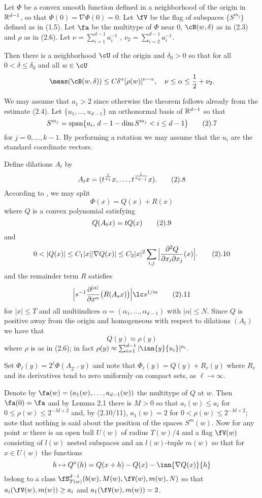  Let $\Phi$ be a convex smooth function 
defined in a neighborhood of the origin
in $\Bbb R^{d-1}$, so that $\Phi(0)=\nabla\Phi(0)=0$. Let
$\fV$ be the flag of subspaces $\{S^{m_j}\}$ defined as in (1.5). 
Let $\fa$ be the multitype of $\Phi$ near $0$, $\cB(w,\delta)$ as in (2.3) and
$\rho$ as in (2.6). Let $\nu=\sum_{i=1}^{d-1} a_i^{-1}$ ,
$\nu_2=\sum_{i=2}^{d-1} a_i^{-1}$. 

Then there is a neighborhood $\cU$ of the origin and 
 $\delta_0> 0$ so that for all $0<\delta\le\delta_0$ and all  $w\in \cU$
$$\meas(\cB(w,\delta))\le C\delta^\alpha [\rho(w)]^{\nu-\alpha},
\quad\nu\le \alpha\le \frac 12 +\nu_2.
$$

\endproclaim

We may assume that $a_1>2$ since otherwise the theorem follows already from the
estimate (2.4).
Let $\{u_1,\dots, u_{d-1}\}$ an orthonormal basis of $\Bbb R^{d-1}$ so that
$$S^{m_j}=\text{span}\{u_i, \, d-1-\dim S^{m_j}<i\le d-1\}\tag 2.7
$$ for $j=0,\dots, k-1$.
By performing a rotation we may assume that the $u_i$ are the standard coordinate vectors. 

Define dilations $A_t$ by
$$A_tx= (t^{\frac{1}{a_1}}x,\dots, t^{\frac{1}{a_{d-1}}}x).\tag 2.8
$$
According to \cite{26}, \cite{16} we may split 
$$\Phi(x) =Q(x)+R(x)$$
where $Q$ is a convex polynomial satisfying 
$$Q(A_t x)=tQ(x) \tag 2.9
$$
and
$$
0<|Q(x)|\le C_1|x||\nabla Q(x)|\le C_2|x|^2 \sum_{i,j}
\Big|\frac{\partial^2 Q}{\partial x_i \partial x_j  }(x)\Big|.
\tag 2.10
$$
and the remainder term $R$ satisfies 
$$
\Big|s^{-1}\frac{\partial^{|\alpha |}}
{ \partial x^\alpha}\big(R(A_s x)\big) \Big| \lc s^{1/m}
\tag 2.11
$$
 for $|x|\le T$ and  all multiindices $\alpha=(\alpha_1,\dots, \alpha_{d-1})$ 
with $|\alpha|\le  N$. 
Since $Q$ is positive away from the origin and homogeneous with respect to dilations $(A_t)$  we have that
$$
Q(y)\approx \rho(y)
$$
where $\rho$ is as  in (2.6); in fact 
$\rho(y)\approx \sum_{i=1}^{d-1}|\inn{y}{u_i}|^{a_i}.$

Set $\Phi_\ell(y)=2^\ell\Phi(A_{2^{-\ell}} y)$ and note that
$\Phi_\ell(y)=Q(y)+R_\ell(y)$ where $R_\ell$ and its derivatives
 tend to zero uniformly on compact sets, as $\ell\to \infty$.


Denote by $\fa(w)=(a_1(w),\dots, a_{d-1}(w))$ the multitype of $Q$ at $w$. 
Then $\fa(0)=\fa$ and
 by Lemma 2.1   there 
is $M>0$ so that $a_i(w)\le a_i$ for $0\le \rho(w)\le 2^{-M+2}$ and, by (2.10/11),  $a_1(w)=2$
for $0< \rho(w)\le 2^{-M+2}$; note that nothing is said about the position of the 
spaces $S^m(w)$.
Now  for any point $w$ there is an open ball $U(w)$ of radius $T(w)/4$
and a  flag $\fV(w)$  consisting of $l(w)$ nested subspaces  and
an $l(w)$-tuple  $m(w)$ so that for $x\in U(w)$ the functions
$$h\mapsto Q^x(h)= Q(x+h)-Q(x)-\inn{\nabla Q(x)}{h}$$
belong to   a class 
$\fS_{T(w)}^{d-1}(b(w),M(w),\fV(w), m(w),N)$ 
so that $a_i(\fV(w), m(w))\ge a_i$ and  $a_1(\fV(w), m(w))=2$.



